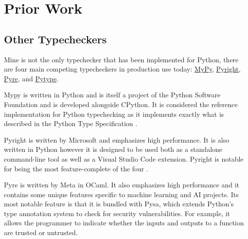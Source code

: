 \documentclass[10pt,twocolumn]{article}
\begin{document}
\section{Prior Work}

\subsection{Other Typecheckers}

Mine is not the only typechecker that has been implemented for Python, there are four main competing typecheckers in production use today: \href{https://mypy-lang.org/}{MyPy}, \href{https://github.com/microsoft/pyright}{Pyright}, \href{https://pyre-check.org/}{Pyre}, and \href{https://github.com/google/pytype}{Pytype}.

Mypy is written in Python and is itself a project of the Python Software Foundation and is developed alongside CPython. It is considered the reference implementation for Python typechecking as it implements exactly what is described in the Python Type Specification \cite{pythontypespec}. 

Pyright is written by Microsoft and emphasizes high performance. It is also written in Python however it is designed to be used both as a standalone command-line tool as well as a Visual Studio Code extension. Pyright is notable for being the most feature-complete of the four \cite{tctestresults}.

Pyre is written by Meta in OCaml. It also emphasizes high performance and it contains some unique features specific to machine learning and AI projects. Its most notable feature is that it is bundled with Pysa, which extends Python's type annotation system to check for security vulnerabilities. For example, it allows the programmer to indicate whether the inputs and outputs to a function are trusted or untrusted.
\end{document}
